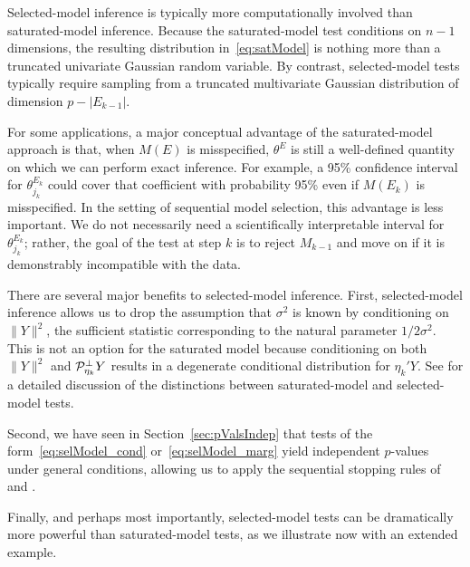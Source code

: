 \documentclass{article}
\begin{document}
Selected-model inference is typically more computationally involved than saturated-model inference. Because the saturated-model test conditions on $n-1$ dimensions, the resulting distribution in~\eqref{eq:satModel} is nothing more than a truncated univariate Gaussian random variable. By contrast, selected-model tests typically require sampling from a truncated multivariate Gaussian distribution of dimension $p-|E_{k-1}|$.

For some applications, a major conceptual advantage of the saturated-model approach is that, when $M(E)$ is misspecified, $\theta^{E}$ is still a well-defined quantity on which we can perform exact inference. For example, a 95\% confidence interval for $\theta_{j_k}^{E_k}$ could cover that coefficient with probability 95\% even if $M(E_k)$ is misspecified. In the setting of sequential model selection, this advantage is less important. We do not necessarily need a scientifically interpretable interval for $\theta_{j_k}^{E_k}$; rather, the goal of the test at step $k$ is to reject $M_{k-1}$ and move on if it is demonstrably incompatible with the data.

There are several major benefits to selected-model inference. First, selected-model inference allows us to drop the assumption that $\sigma^2$ is known by conditioning on $\|Y\|^2$, the sufficient statistic corresponding to the natural parameter $1/2\sigma^2$. This is not an option for the saturated model because conditioning on both $\|Y\|^2$ and $\mathcal{P}_{\eta_k}^\perp Y$ results in a degenerate conditional distribution for $\eta_k'Y$.  See \citet[][Section 5]{fithian2014optimal} for a detailed discussion of the distinctions between saturated-model and selected-model tests.

Second, we have seen in Section~\ref{sec:pValsIndep} that tests of the form~\eqref{eq:selModel_cond} or~\eqref{eq:selModel_marg} yield independent $p$-values under general conditions, allowing us to apply  the sequential stopping rules of~\citet{gsell2013sequential} and \citet{li2015accumulation}.

Finally, and perhaps most importantly, selected-model tests can be dramatically more powerful than saturated-model tests, as we illustrate now with an extended example.
\end{document}
